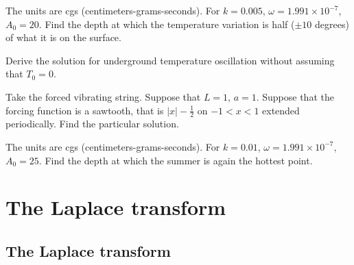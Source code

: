 \documentclass[12pt]{book}
\begin{document}
\begin{exercise}
The units are cgs (centimeters-grams-seconds).
For $k=0.005$, $\omega = 1.991 \times {10}^{-7}$, $A_0 = 20$.
Find the depth at which the temperature variation is half ($\pm 10$
degrees) of what it is on the surface.
\end{exercise}

\begin{exercise}
Derive the solution for underground temperature oscillation without assuming
that $T_0 = 0$.
\end{exercise}

\setcounter{exercise}{100}

\begin{exercise}
Take the forced vibrating string.
Suppose that $L=1$, $a=1$.  Suppose that the forcing function
is a sawtooth, that is $\lvert x \rvert -\frac{1}{2}$
on $-1 < x < 1$ extended periodically.
Find the particular solution.
\end{exercise}

\begin{exercise}
The units are cgs (centimeters-grams-seconds).
For $k=0.01$, $\omega = 1.991 \times {10}^{-7}$, $A_0 = 25$.
Find the depth at which the summer is again the hottest point.
\end{exercise}


\chapter{The Laplace transform} \label{LT:chapter}


\section{The Laplace transform}
\end{document}
